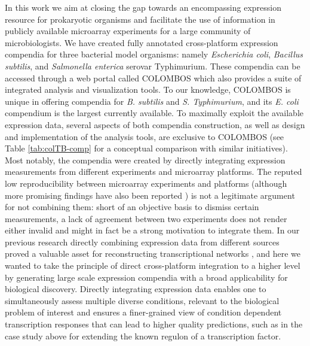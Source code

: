 In this work we aim at closing the gap towards an encompassing expression 
resource for prokaryotic organisms and facilitate the use of information in 
publicly available microarray experiments for a large community of 
microbiologists. We have created fully annotated cross-platform expression 
compendia for three bacterial model organisms: namely {\it Escherichia coli}, 
{\it Bacillus subtilis}, and {\it Salmonella enterica} serovar Typhimurium. 
These compendia can be accessed through a web portal called COLOMBOS which also 
provides a suite of integrated analysis and visualization tools. To our 
knowledge, COLOMBOS is unique in offering compendia for {\it B. subtilis} and 
{\it S. Typhimurium}, and its {\it E. coli} compendium is the largest currently 
available. To maximally exploit the available expression data, several aspects 
of both compendia construction, as well as design and implementation of the 
analysis tools, are exclusive to COLOMBOS (see Table \ref{tab:colTB-comp} for a 
conceptual comparison with similar initiatives). Most notably, the compendia 
were created by directly integrating expression measurements from different 
experiments and microarray platforms. The reputed low reproducibility between 
microarray experiments and platforms \cite{Bammler2005, Tan2003} (although more 
promising findings have also been reported \cite{Shi2006, Kuo2006, Shi2005}) is 
not a legitimate argument for not combining them: short of an objective basis 
to dismiss certain measurements, a lack of agreement between two experiments 
does not render either invalid and might in fact be a strong motivation to 
integrate them. In our previous research directly combining expression data 
from different sources proved a valuable asset for reconstructing 
transcriptional networks \cite{Lemmens2009, Fadda2009, Zarrineh2011}, and here 
we wanted to take the principle of direct cross-platform integration to a 
higher level by generating large scale expression compendia with a broad 
applicability for biological discovery. Directly integrating expression data 
enables one to simultaneously assess multiple diverse conditions, relevant to 
the biological problem of interest and ensures a finer-grained view of 
condition dependent transcription responses that can lead to higher quality 
predictions, such as in the case study above for extending the known regulon of 
a transcription factor.

